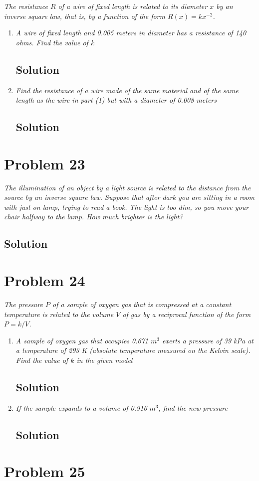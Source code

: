 \documentclass[11pt]{article}
\newcommand{\soln}{\subsection*}
\newcommand{\qn}{\textit}
\begin{document}
\qn{The resistance $R$ of a wire of fixed length is related to its diameter $x$ by an inverse square law, that is, by a function of the form $R(x)=kx^{-2}$.}

\begin{enumerate}
	\item \qn{A wire of fixed length and 0.005 meters in diameter has a resistance of 140 ohms. Find the value of $k$}
	\soln{Solution}
	
	\item \qn{Find the resistance of a wire made of the same material and of the same length as the wire in part (1) but with a diameter of 0.008 meters}
	\soln{Solution}
\end{enumerate}

\section*{Problem 23}

\qn{The illumination of an object by a light source is related to the distance from the source by an inverse square law. Suppose that after dark you are sitting in a room with just on lamp, trying to read a book. The light is too dim, so you move your chair halfway to the lamp. How much brighter is the light?}

\soln{Solution}

\section*{Problem 24}

\qn{The pressure $P$ of a sample of oxygen gas that is compressed at a constant temperature is related to the volume $V$ of gas by a reciprocal function of the form $P=k/V$.}

\begin{enumerate}
	\item \qn{A sample of oxygen gas that occupies 0.671 $m^3$ exerts a pressure of 39 kPa at a temperature of 293 K (absolute temperature measured on the Kelvin scale). Find the value of $k$ in the given model}
	\soln{Solution}
	
	\item \qn{If the sample expands to a volume of 0.916 $m^3$, find the new pressure}
	\soln{Solution}
\end{enumerate}

\section*{Problem 25}
\end{document}
